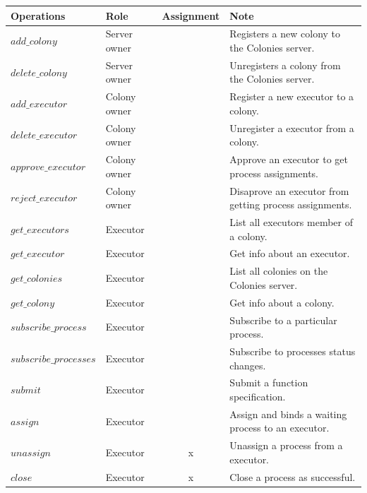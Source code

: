 \documentclass{article}
\begin{document}
\begin{table}[h]
	\centering
	\begin{tabular}{llcl}
		\toprule
		\cmidrule(r){1-4}
        Operations                 & Role         & Assignment & Note \\
		\midrule
        \(add\_colony\)            & Server owner &            & Registers a new colony to the Colonies server. \\
        \(delete\_colony\)         & Server owner &            & Unregisters a colony from the Colonies server. \\
        \(add\_executor\)          & Colony owner &            & Register a new executor to a colony. \\
        \(delete\_executor\)       & Colony owner &            & Unregister a executor from a colony. \\
        \(approve\_executor\)      & Colony owner &            & Approve an executor to get process assignments. \\
        \(reject\_executor\)       & Colony owner &            & Disaprove an executor from getting process assignments. \\
        \(get\_executors\)         & Executor     &            & List all executors member of a colony. \\
        \(get\_executor\)          & Executor     &            & Get info about an executor. \\
        \(get\_colonies\)          & Executor     &            & List all colonies on the Colonies server. \\
        \(get\_colony\)            & Executor     &            & Get info about a colony. \\
        \(subscribe\_process\)     & Executor     &            & Subscribe to a particular process. \\
        \(subscribe\_processes\)   & Executor     &            & Subscribe to processes status changes. \\
        \(submit\)                 & Executor     &            & Submit a function specification. \\
        \(assign\)                 & Executor     &            & Assign and binds a waiting process to an executor. \\
        \(unassign\)               & Executor     & x          & Unassign a process from a executor. \\
        \(close\)                  & Executor     & x          & Close a process as successful. \\

\end{tabular}
\end{table}
\end{document}
